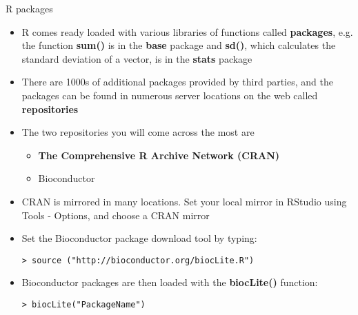 \documentclass{beamer}
\begin{document}
\begin{frame}{R packages}
    \begin{itemize}
        \item R comes ready loaded with various libraries of functions called \textbf{packages}, e.g. the function \textbf{sum()} is in the \textbf{base} package and \textbf{sd()}, which calculates the standard deviation of a vector, is in the \textbf{stats} package
        \item There are 1000s of additional packages provided by third parties, and the packages can be found in numerous server locations on the web called \textbf{repositories}
        \item The two repositories you will come across the most are
        \begin{itemize}
            \item \textbf{The Comprehensive R Archive Network (CRAN)}
            \item Bioconductor
        \end{itemize}
        \item CRAN is mirrored in many locations. Set your local mirror in RStudio using Tools - Options, and choose a CRAN mirror
        \item Set the Bioconductor package download tool by typing:
        \begin{verbatim}
> source ("http://bioconductor.org/biocLite.R")\end{verbatim}
        \item Bioconductor packages are then loaded with the \textbf{biocLite()} function:
        \begin{verbatim}
> biocLite("PackageName")
        \end{verbatim}
    \end{itemize}
\end{frame}
\end{document}
